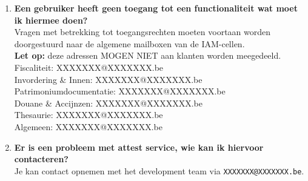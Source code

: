 \begin{enumerate}
    \item \textbf{Een gebruiker heeft geen toegang tot een functionaliteit wat moet ik hiermee doen?} \\
    Vragen met betrekking tot toegangsrechten moeten voortaan worden doorgestuurd naar de algemene mailboxen van de IAM-cellen.\\
    \textbf{Let op:} deze adressen MOGEN NIET aan klanten worden meegedeeld.\\
    Fiscaliteit: XXXXXXX@XXXXXXX.be\\
    Invordering \& Innen: XXXXXXX@XXXXXXX.be \\
    Patrimoniumdocumentatie: XXXXXXX@XXXXXXX.be\\
    Douane \& Accijnzen: XXXXXXX@XXXXXXX.be\\
    Thesaurie: XXXXXXX@XXXXXXX.be\\
    Algemeen: XXXXXXX@XXXXXXX.be
    
    \item \textbf{Er is een probleem met attest service, wie kan ik hiervoor contacteren?} \\
    Je kan contact opnemen met het development team via \texttt{XXXXXXX@XXXXXXX.be}.
    

\end{enumerate}
